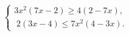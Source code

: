 \begin{ex}[type=ineq_system]
	\begin{condition}
		$\begin{cases} 3x^2(7x - 2)\geqslant4(2 - 7x),\\
			\;2(3x - 4)\leqslant7x^2(4 - 3x).
		\end{cases}$
	\end{condition}
\end{ex}